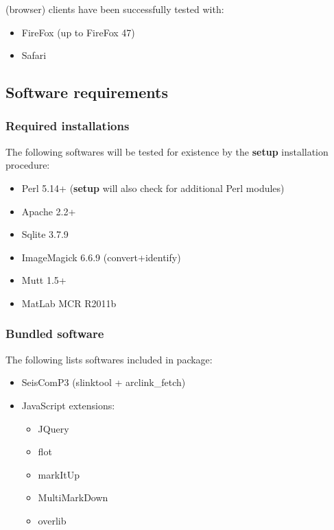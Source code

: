 \webobs (browser) clients have been successfully tested with:
\begin{itemize}
\item   FireFox (up to FireFox 47)
\item   Safari
\end{itemize}


\subsection{Software requirements}

\subsubsection{Required installations}

The following softwares will be tested for existence by the \textbf{setup} installation procedure:

\begin{itemize}
\item   Perl 5.14+ (\textbf{setup} will also check for additional Perl modules)
\item   Apache 2.2+
\item   Sqlite 3.7.9
\item   ImageMagick 6.6.9 (convert+identify)
\item   Mutt 1.5+
\item   MatLab MCR R2011b
\end{itemize}

\subsubsection{Bundled software}

The following lists softwares included in \webobs package:

\begin{itemize}
\item   SeisComP3 (slinktool + arclink\_fetch)
\item   JavaScript extensions:
\begin{itemize}
\item   JQuery
\item   flot
\item   markItUp
\item	MultiMarkDown
\item   overlib
\end{itemize}
\end{itemize}

